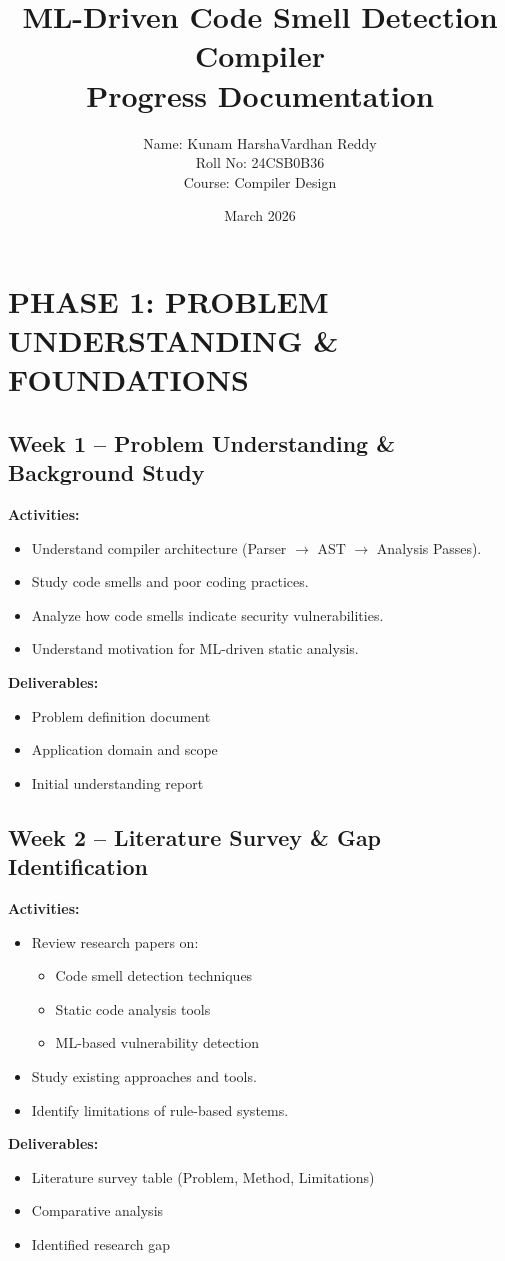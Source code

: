 \documentclass[12pt,a4paper]{article}
\title{ML-Driven Code Smell Detection Compiler \\ \large Progress Documentation}
\author{Name: Kunam HarshaVardhan Reddy \\ Roll No: 24CSB0B36 \\ Course: Compiler Design}
\date{March 2026}
\begin{document}
\maketitle

\section*{PHASE 1: PROBLEM UNDERSTANDING \& FOUNDATIONS}

\subsection*{Week 1 -- Problem Understanding \& Background Study}
\textbf{Activities:}
\begin{itemize}[noitemsep]
    \item Understand compiler architecture (Parser $\rightarrow$ AST $\rightarrow$ Analysis Passes).
    \item Study code smells and poor coding practices.
    \item Analyze how code smells indicate security vulnerabilities.
    \item Understand motivation for ML-driven static analysis.
\end{itemize}
\textbf{Deliverables:}
\begin{itemize}[noitemsep]
    \item Problem definition document
    \item Application domain and scope
    \item Initial understanding report
\end{itemize}

\subsection*{Week 2 -- Literature Survey \& Gap Identification}
\textbf{Activities:}
\begin{itemize}[noitemsep]
    \item Review research papers on:
    \begin{itemize}[noitemsep]
        \item Code smell detection techniques
        \item Static code analysis tools
        \item ML-based vulnerability detection
    \end{itemize}
    \item Study existing approaches and tools.
    \item Identify limitations of rule-based systems.
\end{itemize}
\textbf{Deliverables:}
\begin{itemize}[noitemsep]
    \item Literature survey table (Problem, Method, Limitations)
    \item Comparative analysis
    \item Identified research gap
\end{itemize}
\end{document}

